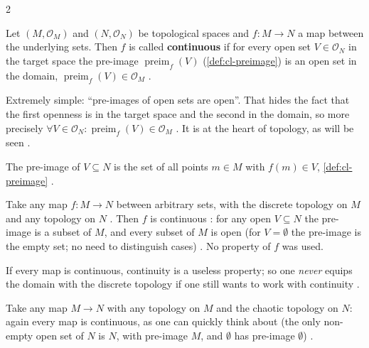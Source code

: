 \begin{paracol}{2}
\begin{definition}\label{def:to-cont}
Let $(M,\mathcal O_M)$ and $(N,\mathcal O_N)$ be topological spaces and $f\colon M\to N$ a map between the underlying sets. Then $f$
is called \textbf{continuous} if for every open set $V\in\mathcal O_N$ in the target space the pre-image $\operatorname{preim}_f(V)$
(\cref{def:cl-preimage}) is an open set in the domain, $\operatorname{preim}_f(V)\in\mathcal O_M$
.
\end{definition}
Extremely simple: ``pre-images of open sets are open''. That hides the fact that the first openness is in the target space and the second in the domain, so more precisely
$\forall V\in\mathcal O_N\colon\operatorname{preim}_f(V)\in\mathcal O_M$ . It is at the heart of topology, as will be
seen .
\begin{recall}
The pre-image of $V\subseteq N$ is the set of all points $m\in M$ with $f(m)\in V$, \cref{def:cl-preimage}
.
\end{recall}

\begin{example}\label{ex:to-cont-discrete}
Take any map $f\colon M\to N$ between arbitrary sets, with the discrete topology on $M$ and any topology on $N$ .
Then $f$ is continuous : for any open $V\subseteq N$ the pre-image is a subset of $M$, and every subset of $M$ is open (for $V=\emptyset$ the
pre-image is the empty set; no need to distinguish cases) . No property of $f$ was used.
\end{example}
If every map is continuous, continuity is a useless property; so one \emph{never} equips the domain with the discrete topology
if one still wants to work with continuity .

\begin{example}\label{ex:to-cont-chaotic}
Take any map $M\to N$ with any topology on $M$ and the chaotic topology on $N$: again every map is continuous, as one can quickly
think about (the only non-empty open set of $N$ is $N$, with pre-image $M$, and $\emptyset$ has pre-image $\emptyset$)
.
\end{example}


\end{paracol}
